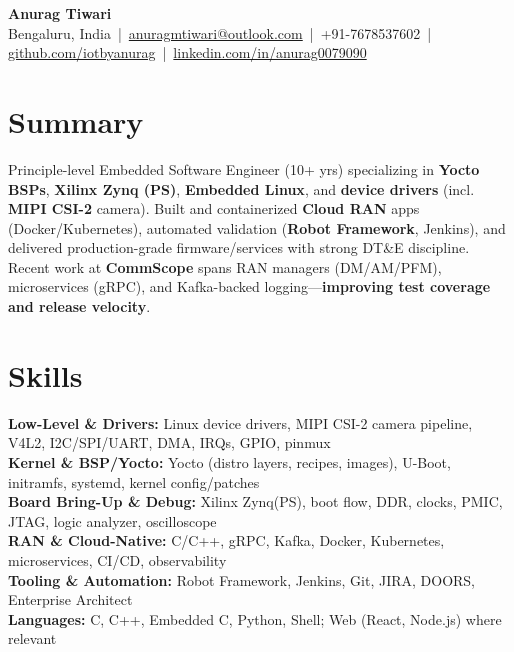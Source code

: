 \documentclass[11pt,a4paper]{article}
\begin{document}
\begin{center}
{\LARGE \textbf{Anurag Tiwari}} \\
Bengaluru, India \,|\, \href{mailto:anuragmtiwari@outlook.com}{anuragmtiwari@outlook.com} \,|\, +91-7678537602 \,|\, 
\href{https://github.com/iotbyanurag}{github.com/iotbyanurag} \,|\, 
\href{https://linkedin.com/in/anurag0079090}{linkedin.com/in/anurag0079090}
\end{center}

\section*{Summary}
Principle-level Embedded Software Engineer (10+ yrs) specializing in \textbf{Yocto BSPs}, \textbf{Xilinx Zynq (PS)}, 
\textbf{Embedded Linux}, and \textbf{device drivers} (incl. \textbf{MIPI CSI-2} camera). Built and containerized \textbf{Cloud RAN} 
apps (Docker/Kubernetes), automated validation (\textbf{Robot Framework}, Jenkins), and delivered 
production-grade firmware/services with strong DT\&E discipline. Recent work at \textbf{CommScope} spans 
RAN managers (DM/AM/PFM), microservices (gRPC), and Kafka-backed logging—\textbf{improving test coverage 
and release velocity}.

\section*{Skills}
\textbf{Low-Level \& Drivers:} Linux device drivers, MIPI CSI-2 camera pipeline, V4L2, I2C/SPI/UART, DMA, IRQs, GPIO, pinmux \\
\textbf{Kernel \& BSP/Yocto:} Yocto (distro layers, recipes, images), U-Boot, initramfs, systemd, kernel config/patches \\
\textbf{Board Bring-Up \& Debug:} Xilinx Zynq(PS), boot flow, DDR, clocks, PMIC, JTAG, logic analyzer, oscilloscope \\
\textbf{RAN \& Cloud-Native:} C/C++, gRPC, Kafka, Docker, Kubernetes, microservices, CI/CD, observability \\
\textbf{Tooling \& Automation:} Robot Framework, Jenkins, Git, JIRA, DOORS, Enterprise Architect \\
\textbf{Languages:} C, C++, Embedded C, Python, Shell; Web (React, Node.js) where relevant

\end{document}
